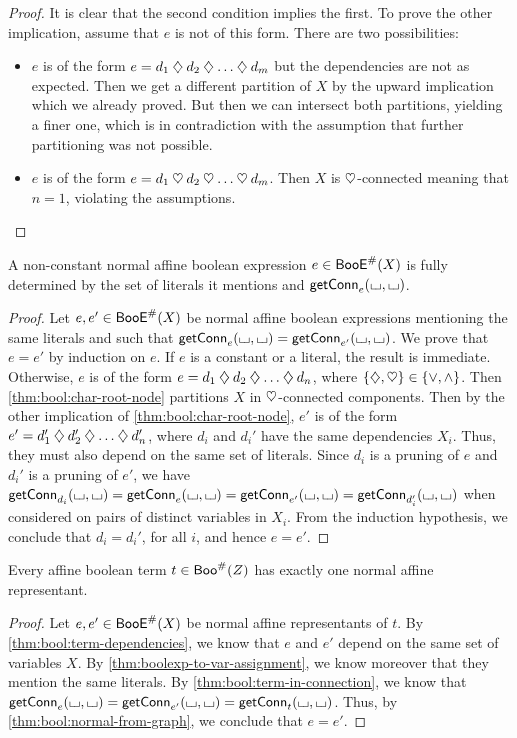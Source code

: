 \documentclass[a4paper]{memoir}
\begin{document}
\begin{proof}
	It is clear that the second condition implies the first.
	To prove the other implication, assume that $e$ is not of this form.
	There are two possibilities:
	\begin{itemize}
		\item $e$ is of the form $e = d_1 \mathbin{\diamondsuit} d_2 \mathbin{\diamondsuit} \ldots \mathbin{\diamondsuit} d_m$ but the dependencies are not as expected.
		Then we get a different partition of $X$ by the upward implication which we already proved.
		But then we can intersect both partitions, yielding a finer one, which is in contradiction with the assumption that further partitioning was not possible.
		\item $e$ is of the form $e = d_1 \mathbin{\heartsuit} d_2 \mathbin{\heartsuit} \ldots \mathbin{\heartsuit} d_m$. Then $X$ is $\mathbin{\heartsuit}$-connected meaning that $n = 1$, violating the assumptions. \qedhere
	\end{itemize}
\end{proof}
\begin{lemma} \label{thm:bool:normal-from-graph}
	A non-constant normal affine boolean expression $e \in \mathsf{BooE}^\#(X)$ is fully determined by the set of literals it mentions and $\mathsf{getConn}_{e}({\llcorner\hspace{-.4ex}\lrcorner}, {\llcorner\hspace{-.4ex}\lrcorner})$.
\end{lemma}
\begin{proof}
	Let $e, e' \in \mathsf{BooE}^\#(X)$ be normal affine boolean expressions mentioning the same literals and such that $\mathsf{getConn}_{e}({\llcorner\hspace{-.4ex}\lrcorner}, {\llcorner\hspace{-.4ex}\lrcorner}) = \mathsf{getConn}_{e'}({\llcorner\hspace{-.4ex}\lrcorner}, {\llcorner\hspace{-.4ex}\lrcorner})$.
	We prove that $e = e'$ by induction on $e$.
	If $e$ is a constant or a literal, the result is immediate.
	Otherwise, $e$ is of the form $e = d_1 \mathbin{\diamondsuit} d_2 \mathbin{\diamondsuit} \ldots \mathbin{\diamondsuit} d_n$, where $\mathopen{}\left\{ {\mathbin{\diamondsuit}}, {\mathbin{\heartsuit}} \right\}\mathclose{} \in \mathopen{}\left\{ {\vee}, {\wedge} \right\}\mathclose{}$.
	Then \cref{thm:bool:char-root-node} partitions $X$ in $\mathbin{\heartsuit}$-connected components.
	Then by the other implication of \cref{thm:bool:char-root-node}, $e'$ is of the form $e' = d_1' \mathbin{\diamondsuit} d_2' \mathbin{\diamondsuit} \ldots \mathbin{\diamondsuit} d_n'$, where $d_i$ and $d_i'$ have the same dependencies $X_i$.
	Thus, they must also depend on the same set of literals.
	Since $d_i$ is a pruning of $e$ and $d_i'$ is a pruning of $e'$, we have $\mathsf{getConn}_{d_i}({\llcorner\hspace{-.4ex}\lrcorner}, {\llcorner\hspace{-.4ex}\lrcorner}) = \mathsf{getConn}_{e}({\llcorner\hspace{-.4ex}\lrcorner}, {\llcorner\hspace{-.4ex}\lrcorner}) = \mathsf{getConn}_{e'}({\llcorner\hspace{-.4ex}\lrcorner}, {\llcorner\hspace{-.4ex}\lrcorner}) = \mathsf{getConn}_{d_i'}({\llcorner\hspace{-.4ex}\lrcorner}, {\llcorner\hspace{-.4ex}\lrcorner})$ when considered on pairs of distinct variables in $X_i$.
	From the induction hypothesis, we conclude that $d_i = d_i'$, for all $i$, and hence $e = e'$.
\end{proof}
\begin{theorem} \label{thm:bool:normalization}
	Every affine boolean term $t \in \mathsf{Boo}^\#(Z)$ has exactly one normal affine representant.
\end{theorem}
\begin{proof}
	Let $e, e' \in \mathsf{BooE}^\#(X)$ be normal affine representants of $t$.
	By \cref{thm:bool:term-dependencies}, we know that $e$ and $e'$ depend on the same set of variables $X$.
	By \cref{thm:boolexp-to-var-assignment}, we know moreover that they mention the same literals.
	By \cref{thm:bool:term-in-connection}, we know that $\mathsf{getConn}_{e}({\llcorner\hspace{-.4ex}\lrcorner}, {\llcorner\hspace{-.4ex}\lrcorner}) = \mathsf{getConn}_{e'}({\llcorner\hspace{-.4ex}\lrcorner}, {\llcorner\hspace{-.4ex}\lrcorner}) = \mathsf{getConn}_{t}({\llcorner\hspace{-.4ex}\lrcorner}, {\llcorner\hspace{-.4ex}\lrcorner})$.
	Thus, by \cref{thm:bool:normal-from-graph}, we conclude that $e = e'$.
\end{proof}
\end{document}
